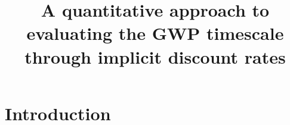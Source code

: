 \documentclass[gc, manuscript]{copernicus}
\begin{document}
\title{A quantitative approach to evaluating the GWP timescale through implicit
discount rates}


\Author[]{}{}












\received{}
\pubdiscuss{} %
\revised{}
\accepted{}
\published{}




\maketitle






\section{Introduction}
\end{document}
